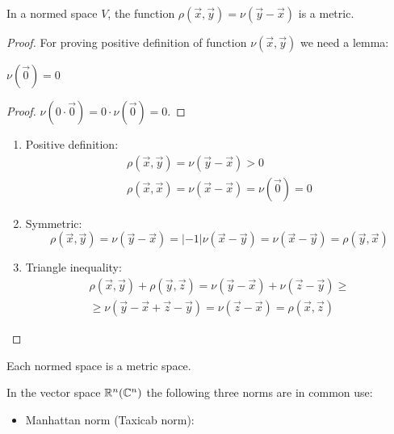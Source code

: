 \begin{proposition}{}{}
    In a normed space $V$, the function $\rho\left(\vec{x},\vec{y}\right) = \nu\left(\vec{y} - \vec{x}\right)$ is a metric.
\end{proposition}
\begin{proof}
    For proving positive definition of function $\nu\left(\vec{x}, \vec{y}\right)$ we need a lemma:
    \begin{lemma}{}{}
        $\nu\left(\vec{0}\right) = 0$
    \end{lemma}
    \begin{proof}
        $\nu\left(0 \cdot \vec{0}\right) = 0 \cdot \nu\left(\vec{0}\right) = 0.$
    \end{proof}
    \begin{enumerate}
        \item Positive definition:
        \[ 
            \begin{array}{c}
                \displaystyle\rho\left(\vec{x}, \vec{y}\right) = \nu\left(\vec{y} - \vec{x}\right) > 0  \\
                \displaystyle \rho\left(\vec{x}, \vec{x}\right) = \nu\left(\vec{x} - \vec{x}\right) = \nu\left(\vec{0}\right) = 0 
            \end{array}
        \]
        \item Symmetric:
        \[
            \rho\left(\vec{x}, \vec{y}\right) = \nu\left(\vec{y} - \vec{x}\right) = |-1|\nu\left(\vec{x} - \vec{y}\right) = \nu\left(\vec{x} - \vec{y}\right) = \rho\left(\vec{y}, \vec{x}\right)
        \]
        \item Triangle inequality:
        \[
            \begin{array}{c}
                \rho\left(\vec{x}, \vec{y}\right) + \rho\left(\vec{y}, \vec{z}\right) = \nu\left(\vec{y} - \vec{x}\right) + \nu\left(\vec{z} - \vec{y}\right) \geq \\ \geq \nu\left(\vec{y} - \vec{x} + \vec{z} -\vec{y} \right) = \nu\left(\vec{z} - \vec{x}\right) = \rho\left(\vec{x}, \vec{z}\right)
            \end{array}
        \]
    \end{enumerate}
\end{proof}
\begin{note}{}{}
    Each normed space is a metric space.
\end{note}

\par
\Ex In the vector space $\mathbb{R}^n (\mathbb{C}^n)$ the following three norms are in common use:
    \begin{itemize}
        \item Manhattan norm (Taxicab norm):
        
    \end{itemize}

